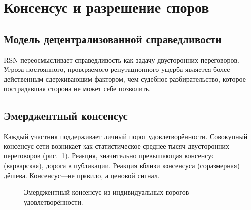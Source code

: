 \documentclass[11pt,a4paper,twocolumn]{article}
\begin{document}
\section{Консенсус и разрешение споров}

\subsection{Модель децентрализованной справедливости}

RSN переосмысливает справедливость как задачу двусторонних переговоров. Угроза постоянного, проверяемого репутационного ущерба является более действенным сдерживающим фактором, чем судебное разбирательство, которое пострадавшая сторона не может себе позволить.

\subsection{Эмерджентный консенсус}

Каждый участник поддерживает личный порог удовлетворённости. Совокупный консенсус сети возникает как статистическое среднее тысяч двусторонних переговоров (рис.~\ref{fig:consensus}). Реакция, значительно превышающая консенсус (варварская), дорога в публикации. Реакция вблизи консенсуса (соразмерная) дёшева. Консенсус---не правило, а ценовой сигнал.

\begin{figure}[ht]
\centering
{}
\caption{Эмерджентный консенсус из индивидуальных порогов удовлетворённости.}
\label{fig:consensus}
\end{figure}
\end{document}
